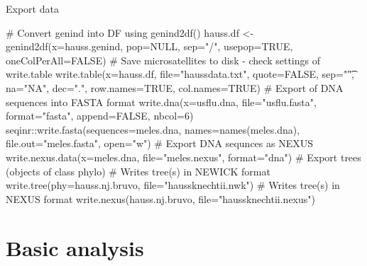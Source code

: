 \documentclass[compress, ucs, xelatex, 11pt, xcolor=svgnames,
  hyperref={
    bookmarks=true,
    unicode=true,
    colorlinks=true,
    pdftitle={Molecular data in R},
    plainpages=false,
    pdfauthor={Vojtech Zeisek},
    pdfsubject={Course about phylogeny and evolution in R},
    pdfcreator={XeLaTeX},
    pdfkeywords={R, evolution, phylogeny, molecular data},
    linkcolor=Tomato,
    anchorcolor=SaddleBrown,
    citecolor=Goldenrod,
    filecolor=DarkMagenta,
    menucolor=Sienna,
    urlcolor=DarkTurquoise,
    pdftex},
  url={hyphens, lowtilde} %
  ]{beamer}
\begin{document}
\begin{frame}[fragile]{Export data}
  \begin{spluscode}
    # Convert genind into DF using genind2df()
    hauss.df <- genind2df(x=hauss.genind, pop=NULL, sep="/",
      usepop=TRUE, oneColPerAll=FALSE)
    # Save microsatellites to disk - check settings of write.table
    write.table(x=hauss.df, file="haussdata.txt", quote=FALSE,
      sep="\t", na="NA", dec=".", row.names=TRUE, col.names=TRUE)
    # Export of DNA sequences into FASTA format
    write.dna(x=usflu.dna, file="usflu.fasta", format="fasta",
      append=FALSE, nbcol=6)
    seqinr::write.fasta(sequences=meles.dna, names=names(meles.dna),
      file.out="meles.fasta", open="w")
    # Export DNA sequnces as NEXUS
    write.nexus.data(x=meles.dna, file="meles.nexus", format="dna")
    # Export trees (objects of class phylo)
    # Writes tree(s) in NEWICK format
    write.tree(phy=hauss.nj.bruvo, file="haussknechtii.nwk")
    # Writes tree(s) in NEXUS format
    write.nexus(hauss.nj.bruvo, file="haussknechtii.nexus")
  \end{spluscode}
\end{frame}

\section{Basic analysis}
\end{document}
